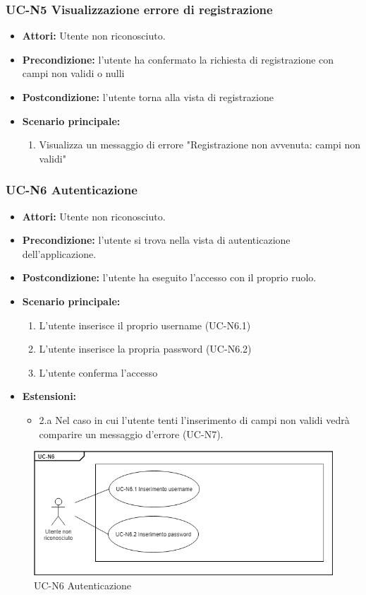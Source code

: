 \subsubsection{UC-N5 Visualizzazione errore di registrazione}
\begin{itemize}
	\item \textbf{Attori:} Utente non riconosciuto.
	\item \textbf{Precondizione:} l'utente ha confermato la richiesta di registrazione con campi non validi o nulli
	\item \textbf{Postcondizione:} l'utente torna alla vista di registrazione
	\item  \textbf{Scenario principale: }
	\begin{enumerate}
		\item Visualizza un messaggio di errore "Registrazione non avvenuta: campi non validi"
	\end{enumerate}
\end{itemize}

\subsubsection{UC-N6 Autenticazione}
		\begin{itemize}
			\item \textbf{Attori:} Utente non riconosciuto.
			\item \textbf{Precondizione:} l'utente si trova nella vista di autenticazione dell'applicazione.
			\item \textbf{Postcondizione:} l'utente ha eseguito l'accesso con il proprio ruolo.
			\item \textbf{Scenario principale:}
				\begin{enumerate}
					\item L'utente inserisce il proprio username (UC-N6.1)
					\item L'utente inserisce la propria password (UC-N6.2)
					\item L'utente conferma l'accesso
				\end{enumerate}
				\item \textbf{Estensioni:}
				\begin{itemize}
					\item 2.a Nel caso in cui l'utente tenti l'inserimento di campi non validi vedrà comparire un messaggio d'errore (UC-N7).
				\end{itemize}
		\end{itemize}
		\begin{figure}[htbp]
			\centering
			\includegraphics[scale=0.7]{images/UC-N6.png}
			\caption{UC-N6 Autenticazione}
		\end{figure}		
		
